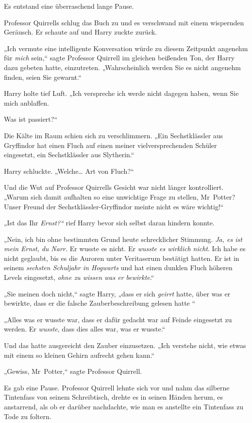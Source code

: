 {Es entstand eine überraschend lange Pause.

Professor Quirrells schlug das Buch zu und es verschwand mit einem wispernden Geräusch. Er schaute auf und Harry zuckte zurück.

„Ich vermute eine intelligente Konversation würde zu diesem Zeitpunkt angenehm für \emph{mich} sein,“ sagte Professor Quirrell im gleichen beißenden Ton, der Harry dazu gebeten hatte, einzutreten. „Wahrscheinlich werden Sie es nicht angenehm finden, seien Sie gewarnt.“

Harry holte tief Luft. „Ich verspreche ich werde nicht dagegen haben, wenn Sie mich anblaffen.

Was ist passiert?“

Die Kälte im Raum schien sich zu verschlimmern. „Ein Sechstklässler aus Gryffindor hat einen Fluch auf einen meiner vielversprechenden Schüler eingesetzt, ein Sechstklässler aus Slytherin.“

Harry schluckte. „Welche… Art von Fluch?“

Und die Wut auf Professor Quirrells Gesicht war nicht länger kontrolliert. „Warum sich damit aufhalten so eine unwichtige Frage zu stellen, Mr~Potter? Unser Freund der Sechstklässler-Gryffindor meinte nicht es wäre wichtig!“

„Ist das Ihr \emph{Ernst?“} rief Harry bevor sich selbst daran hindern konnte.

„Nein, ich bin ohne bestimmten Grund heute schrecklicher Stimmung. \emph{Ja, es ist mein Ernst,} \emph{du Narr.} Er wusste es nicht. Er \emph{wusste es wirklich nicht}. Ich habe es nicht geglaubt, bis es die Auroren unter Veritaserum bestätigt hatten. Er ist in seinem \emph{sechsten Schuljahr in Hogwarts} und hat einen dunklen Fluch höheren Levels eingesetzt, \emph{ohne zu wissen was er bewirkte}.“

„Sie meinen doch nicht,“ sagte Harry, „dass er sich \emph{geirrt} hatte, über was er bewirkte, dass er die falsche Zauberbeschreibung gelesen hatte \later“

„Alles was er wusste war, dass er dafür gedacht war auf Feinde eingesetzt zu werden. Er \emph{wusste}, dass dies alles war, was er wusste.“

Und das hatte ausgereicht den Zauber einzusetzen. „Ich verstehe nicht, wie etwas mit einem so kleinen Gehirn aufrecht gehen kann.“

„Gewiss, Mr~Potter,“ sagte Professor Quirrell.

Es gab eine Pause. Professor Quirrell lehnte sich vor und nahm das silberne Tintenfass von seinem Schreibtisch, drehte es in seinen Händen herum, es anstarrend, als ob er darüber nachdachte, wie man es anstellte ein Tintenfass zu Tode zu foltern.

}
